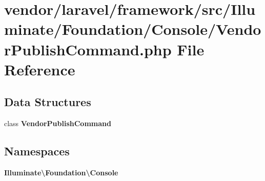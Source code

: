 \section{vendor/laravel/framework/src/\+Illuminate/\+Foundation/\+Console/\+Vendor\+Publish\+Command.php File Reference}
\label{_vendor_publish_command_8php}
\subsection*{Data Structures}
\begin{DoxyCompactItemize}
\item 
class {\bf Vendor\+Publish\+Command}
\end{DoxyCompactItemize}
\subsection*{Namespaces}
\begin{DoxyCompactItemize}
\item 
 {\bf Illuminate\textbackslash{}\+Foundation\textbackslash{}\+Console}
\end{DoxyCompactItemize}
